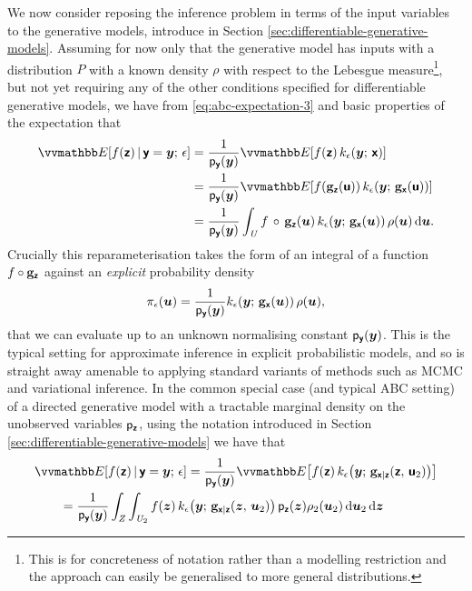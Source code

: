 We now consider reposing the inference problem in terms of the input variables to the generative models, introduce in Section \ref{sec:differentiable-generative-models}. Assuming for now only that the generative model has inputs with a distribution $P$ with a known density $\rho$ with respect to the Lebesgue measure\footnote{This is for concreteness of notation rather than a modelling restriction and  the approach can easily be generalised to more general distributions.}, but not yet requiring any of the other conditions specified for differentiable generative models, we have from \eqref{eq:abc-expectation-3} and basic properties of the expectation that
\begin{align}\label{eq:abc-expectation-input-space}
  \expc{f(\rvct{z}) \gvn \rvct{y}=\vct{y};\,\epsilon} &=
  \frac{1}{\pden{\rvct{y}}(\vct{y})} \expc{f(\rvct{z}) \, k_\epsilon(\vct{y};\,\rvct{x})}
  \\
  &=
  \frac{1}{\pden{\rvct{y}}(\vct{y})} 
  \expc{f\lpa\genfunc_{\rvct{z}}(\rvct{u})\rpa \, k_\epsilon\lpa\vct{y};\,\genfunc_{\rvct{x}}(\rvct{u})\rpa}
  \\
  &=
  \frac{1}{\pden{\rvct{y}}(\vct{y})}
  \int_{\set{U}} 
    f\,\circ\,\genfunc_{\rvct{z}}(\vct{u}) \,
    k_\epsilon{\lpa\vct{y};\,\genfunc_{\rvct{x}}(\vct{u})\rpa}\,
    \rho(\vct{u})
  \,\dr\vct{u}.
\end{align}
Crucially this reparameterisation takes the form of an integral of a function $f\circ{\mathbf{g}}_{\boldsymbol{\mathsf{z}}}$ against an \emph{explicit} probability density 
\begin{equation}\label{eq:abc-density-input-space}
  \pi_\epsilon(\vct{u}) = \frac{1}{\pden{\rvct{y}}(\vct{y})} 
  k_\epsilon{\lpa\vct{y};\,\genfunc_{\rvct{x}}(\vct{u})\rpa}\,\rho(\vct{u}),
\end{equation}
that we can evaluate up to an unknown normalising constant $\mathsf{p}_{\boldsymbol{\mathsf{y}}}(\boldsymbol{y})$. This is the typical setting for approximate inference in explicit probabilistic models, and so is straight away amenable to applying standard variants of methods such as \ac{MCMC} and variational inference. In the common special case (and typical \ac{ABC} setting) of a directed generative model with a tractable marginal density on the unobserved variables $\mathsf{p}_{\boldsymbol{\mathsf{z}}}$, using the notation introduced in Section \eqref{sec:differentiable-generative-models} we have that
\begin{align}\label{eq:abc-expectation-input-space-directed}
  &\expc{f(\rvct{z}) \gvn \rvct{y}=\vct{y};\,\epsilon} =
  \frac{1}{\pden{\rvct{y}}(\vct{y})} 
  \expc{f(\rvct{z}) \, k_\epsilon\lpa\vct{y};\,\genfunc_{\rvct{x}|\rvct{z}}(\rvct{z},\,\rvct{u}_2)\rpa}
  \\
  &\qquad=
  \frac{1}{\pden{\rvct{y}}(\vct{y})}
  \int_\set{Z}\int_{\set{U}_2} 
    f(\vct{z}) \,
    k_\epsilon{\lpa\vct{y};\,\genfunc_{\rvct{x}|\rvct{z}}(\vct{z},\,\vct{u}_2)\rpa}\,
    \pden{\rvct{z}}(\vct{z})
    \rho_2(\vct{u}_2)
  \,\dr\vct{u}_2\,\dr\vct{z}
\end{align}
